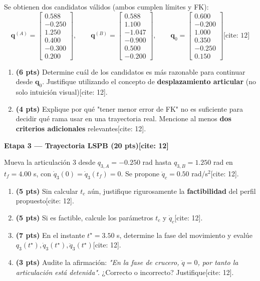 \documentclass[11pt, a4paper]{article}
\begin{document}
Se obtienen dos candidatos válidos (ambos cumplen límites y FK):
\begin{equation*}
    \mathbf{q}^{(A)} = \begin{bmatrix} 0.588 \\ -0.250 \\ 1.250 \\ 0.400 \\ -0.300 \\ 0.200 \end{bmatrix}, \qquad \mathbf{q}^{(B)} = \begin{bmatrix} 0.588 \\ 1.100 \\ -1.047 \\ -0.900 \\ 0.500 \\ -0.200 \end{bmatrix}, \qquad \mathbf{q}_0 = \begin{bmatrix} 0.600 \\ -0.200 \\ 1.000 \\ 0.350 \\ -0.250 \\ 0.150 \end{bmatrix} \text{[cite: 12]}
\end{equation*}

\begin{enumerate}[label=\textbf{2.\arabic*.}]
    \item \textbf{(6 pts)} Determine cuál de los candidatos es más razonable para continuar desde $\mathbf{q}_0$. Justifique utilizando el concepto de \textbf{desplazamiento articular} (no solo intuición visual)[cite: 12].
    \item \textbf{(4 pts)} Explique por qué "tener menor error de FK" no es suficiente para decidir qué rama usar en una trayectoria real. Mencione al menos \textbf{dos criterios adicionales} relevantes[cite: 12].
\end{enumerate}

\noindent\textbf{\large Etapa 3 — Trayectoria LSPB (20 pts)[cite: 12]}

Mueva la articulación 3 desde $q_{3,A} = -0.250$ rad hasta $q_{3,B} = 1.250$ rad en $t_f = 4.00$ s, con $\dot{q}_3(0) = \dot{q}_3(t_f) = 0$. Se propone $\ddot{q}_c = 0.50$ rad/s$^2$[cite: 12].

\begin{enumerate}[label=\textbf{3.\arabic*.}]
    \item \textbf{(5 pts)} Sin calcular $t_c$ aún, justifique rigurosamente la \textbf{factibilidad} del perfil propuesto[cite: 12].
    \item \textbf{(5 pts)} Si es factible, calcule los parámetros $t_c$ y $\dot{q}_c$[cite: 12].
    \item \textbf{(7 pts)} En el instante $t^\star = 3.50$ s, determine la fase del movimiento y evalúe $q_3(t^\star), \dot{q}_3(t^\star), \ddot{q}_3(t^\star)$[cite: 12].
    \item \textbf{(3 pts)} Audite la afirmación: \textit{"En la fase de crucero, $\ddot{q} = 0$, por tanto la articulación está detenida"}. ¿Correcto o incorrecto? Justifique[cite: 12].
\end{enumerate}
\end{document}
